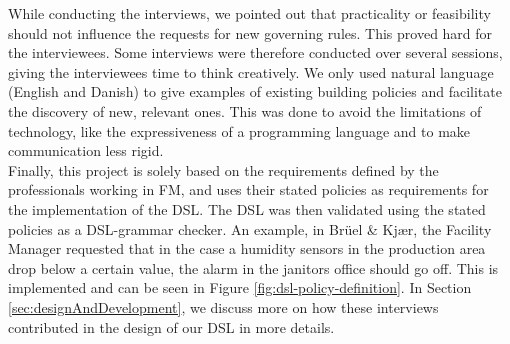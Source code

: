 While conducting the interviews, we pointed out that practicality or feasibility should not influence the requests for new governing rules. This proved hard for the interviewees. Some interviews were therefore conducted over several sessions, giving the interviewees time to think creatively. We only used natural language (English and Danish) to give examples of existing building policies and facilitate the discovery of new, relevant ones. This was done to avoid the limitations of technology, like the expressiveness of a programming language and to make communication less rigid.\\ 

Finally, this project is solely based on the requirements defined by the professionals working in FM, and uses their stated policies as requirements for the implementation of the DSL. The DSL was then validated using the stated policies as a DSL-grammar checker. An example, in Br\"{u}el \& Kj\ae r, the Facility Manager requested that in the case a humidity sensors in the production area drop below a certain value, the alarm in the janitors office should go off. This is implemented and can be seen in Figure \ref{fig:dsl-policy-definition}. In Section \ref{sec:designAndDevelopment}, we discuss more on how these interviews contributed in the design of our DSL in more details.